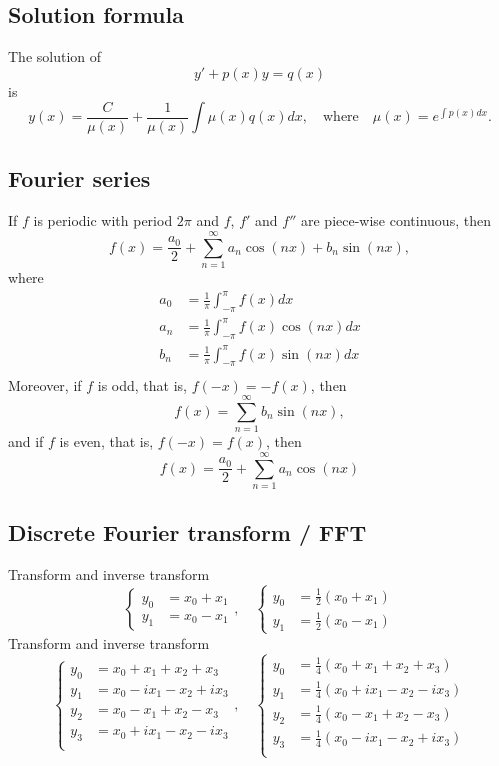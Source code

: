 \documentclass[12pt]{article}
\begin{document}
\newpage
\subsection*{Solution formula}

The solution of
$$
y'+p(x)y=q(x)
$$
is
$$
y(x)=\frac{C}{\mu(x)}+\frac{1}{\mu(x)}\int \mu(x)q(x)dx,\quad\textrm{where}\quad
\mu(x)=e^{\int p(x)dx}.
$$

\subsection*{Fourier series}

If $f$ is periodic with period $2\pi$ and $f$, $f'$ and $f''$ are piece-wise continuous, then
$$
f(x)
=\frac{a_0}{2}
+\sum_{n=1}^\infty a_n\cos(nx)+b_n\sin(nx),
$$
where
\begin{equation*}
\begin{split}
a_0&=\frac{1}{\pi}\int_{-\pi}^{\pi}
f(x)dx\\
a_n&=\frac{1}{\pi}\int_{-\pi}^{\pi}
f(x)\cos(nx)dx\\
b_n&=\frac{1}{\pi}\int_{-\pi}^{\pi}
f(x)\sin(nx)dx\\
\end{split}
\end{equation*}
Moreover, if $f$ is odd, that is, $f(-x)=-f(x)$,
then
$$
f(x)
=\sum_{n=1}^\infty b_n\sin(nx),
$$
and if $f$ is even, that is, $f(-x)=f(x)$, then
$$
f(x)
=\frac{a_0}{2}
+\sum_{n=1}^\infty a_n\cos(nx)
$$

\subsection*{Discrete Fourier transform / FFT}

Transform and inverse transform
$$
\begin{cases}
y_0&=x_0+x_1\\
y_1&=x_0-x_1
\end{cases},\quad
\begin{cases}
y_0&=\frac{1}{2}(x_0+x_1)\\
y_1&=\frac{1}{2}(x_0-x_1)
\end{cases}
$$
Transform and inverse transform
$$
\begin{cases}
y_0&=x_0+x_1+x_2+x_3\\
y_1&=x_0-ix_1-x_2+ix_3\\
y_2&=x_0-x_1+x_2-x_3\\
y_3&=x_0+ix_1-x_2-ix_3\\
\end{cases},\quad
\begin{cases}
y_0&=\frac{1}{4}(x_0+x_1+x_2+x_3)\\
y_1&=\frac{1}{4}(x_0+ix_1-x_2-ix_3)\\
y_2&=\frac{1}{4}(x_0-x_1+x_2-x_3)\\
y_3&=\frac{1}{4}(x_0-ix_1-x_2+ix_3)\\
\end{cases}
$$
\end{document}
